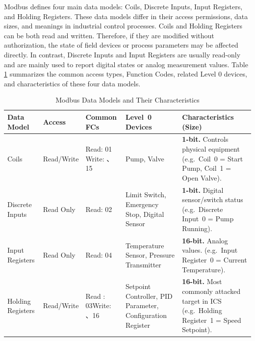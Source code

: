 Modbus defines four main data models: Coils, Discrete Inputs, Input Registers, and Holding Registers. These data models differ in their access permissions, data sizes, and meanings in industrial control processes. Coils and Holding Registers can be both read and written. Therefore, if they are modified without authorization, the state of field devices or process parameters may be affected directly. In contrast, Discrete Inputs and Input Registers are usually read-only and are mainly used to report digital states or analog measurement values. Table \ref{tab:modbus_data_model} summarizes the common access types, Function Codes, related Level 0 devices, and characteristics of these four data models.

\begin{table}[htbp]
\caption{Modbus Data Models and Their Characteristics}
\centering
\renewcommand{\arraystretch}{1.4}
\begin{tabularx}{\textwidth}{@{} p{1.5cm} p{1.4cm} p{1.9cm} p{3.1cm} X @{}}
\toprule
\textbf{Data Model} &
\textbf{Access} &
\textbf{Common FCs} &
\textbf{Level~0 \newline Devices} &
\textbf{Characteristics (Size)} \\
\midrule

Coils
  & Read/Write
  & Read: 01 \newline Write: \newline05、15
  & Pump, Valve
  & \textbf{1-bit.} Controls physical equipment
    (e.g.\ Coil~0 = Start Pump, Coil~1 = Open Valve). \\
\addlinespace

Discrete Inputs
  & Read Only
  & Read: 02
  & Limit Switch, Emergency Stop, Digital Sensor
  & \textbf{1-bit.} Digital sensor/switch status
    (e.g.\ Discrete Input~0 = Pump Running). \\
\addlinespace

Input \newline Registers
  & Read Only
  & Read: 04
  & Temperature Sensor, \newline Pressure \newline Transmitter
  & \textbf{16-bit.} Analog values.
    (e.g.\ Input Register~0 = Current Temperature). \\
\addlinespace

Holding Registers
  & Read/Write
  & Read : 03\newline Write: \newline06、16
  & Setpoint Controller, PID Parameter, Configuration Register
  & \textbf{16-bit.} Most commonly attacked target in ICS
    (e.g.\ Holding Register~1 = Speed Setpoint). \\

\bottomrule
\end{tabularx}

\label{tab:modbus_data_model}
\end{table}

